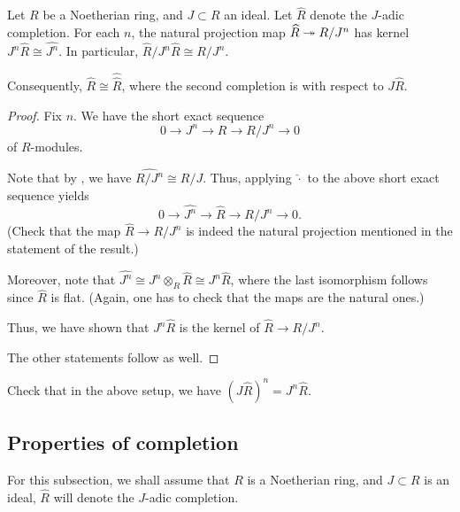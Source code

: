 \documentclass[12pt]{article}
\begin{document}
\begin{cor} \label{cor:completion-of-completion}
	Let $R$ be a Noetherian ring, and $J \subset R$ an ideal. Let $\widehat{R}$ denote the $J$-adic completion. \newline
	For each $n$, the natural projection map $\widehat{R} \twoheadrightarrow R/J^{n}$ has kernel $J^{n} \widehat{R} \cong \widehat{J^{n}}$. \newline
	In particular, $\widehat{R}/J^{n} \widehat{R} \cong R/J^{n}$.

	Consequently, $\widehat{R} \cong \widehat{\widehat{R}}$, where the second completion is with respect to $J \widehat{R}$.
\end{cor}
\begin{proof} 
	Fix $n$. We have the short exact sequence
	\begin{equation*} 
		0 \to J^{n} \to R \to R/J^{n} \to 0
	\end{equation*}
	of $R$-modules.

	Note that by , we have $\widehat{R/J^{n}} \cong R/J$. Thus, applying $\widehat{\cdot}$ to the above short exact sequence yields
	\begin{equation*} 
		0 \to \widehat{J^{n}} \to \widehat{R} \to R/J^{n} \to 0.
	\end{equation*}
	(Check that the map $\widehat{R} \to R/J^{n}$ is indeed the natural projection mentioned in the statement of the result.)

	Moreover, note that $\widehat{J^{n}} \cong J^{n} \otimes_{R} \widehat{R} \cong J^{n} \widehat{R}$, where the last isomorphism follows since $\widehat{R}$ is flat. (Again, one has to check that the maps are the natural ones.)

	Thus, we have shown that $J^{n} \widehat{R}$ is the kernel of $\widehat{R} \to R/J^{n}$.

	The other statements follow as well.
\end{proof}

\begin{exe}
	Check that in the above setup, we have $(J \widehat{R})^{n} = J^{n} \widehat{R}$.
\end{exe}

\subsection{Properties of completion}

For this subsection, we shall assume that $R$ is a Noetherian ring, and $J \subset R$ is an ideal, $\widehat{R}$ will denote the $J$-adic completion.
\end{document}
